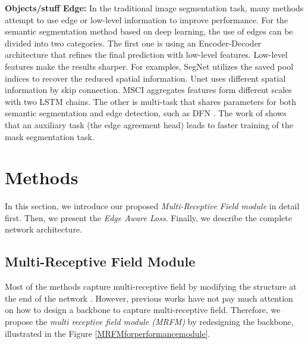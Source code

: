 \documentclass[final]{cvpr}
\begin{document}
\textbf{Objects/stuff Edge:} In the traditional image segmentation task, many methods attempt to use edge or low-level information to improve performance.
For the semantic segmentation method based on deep learning, the use of edges can be divided into two categories. The first one is using an Encoder-Decoder architecture that refines the final prediction with low-level features.
Low-level features make the results sharper. For examples, SegNet \cite{SegNet} utilizes the saved pool indices to recover the reduced spatial information. Unet \cite{Unet} uses different spatial information by skip connection. MSCI \cite{MSCI} aggregates features form different scales with two LSTM chains. The other is multi-task that shares  parameters for both semantic segmentation and edge detection, such as DFN \cite{DFN}. The work of \cite{fastermaskrcnn} shows that an auxiliary task (the edge agreement head) leads  to faster training of the mask segmentation task.




\section{Methods}
In this section, we introduce our proposed \emph{Multi-Receptive Field module} in detail first. Then, we present the \emph{Edge Aware Loss}. Finally, we describe the complete network architecture.

\subsection{Multi-Receptive Field Module}

Most of the methods capture multi-receptive field by modifying the structure at the end of the network \cite{Deeplabv2,PSPNet,DenseASPP}. However, previous works have not pay much attention on how to design a backbone to capture multi-receptive field. Therefore, we propose the \emph{multi receptive field module (MRFM)} by redesigning the backbone, illustrated in the Figure \ref{MRFMforperformancemodule}.
\end{document}
